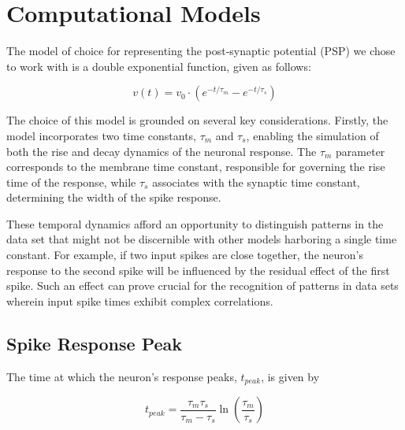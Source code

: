 \section{Computational Models}

The model of choice for representing the post-synaptic potential (PSP) we chose to work with is a double exponential function, given as follows:

\begin{equation}
    v(t) = v_0 \cdot (e^{-t/\tau_m} - e^{-t/\tau_s})
\end{equation}

The choice of this model is grounded on several key considerations. Firstly, the model incorporates two time constants, $\tau_m$ and $\tau_s$, enabling the simulation of both the rise and decay dynamics of the neuronal response. The $\tau_m$ parameter corresponds to the membrane time constant, responsible for governing the rise time of the response, while $\tau_s$ associates with the synaptic time constant, determining the width of the spike response.

These temporal dynamics afford an opportunity to distinguish patterns in the data set that might not be discernible with other models harboring a single time constant. For example, if two input spikes are close together, the neuron's response to the second spike will be influenced by the residual effect of the first spike. Such an effect can prove crucial for the recognition of patterns in data sets wherein input spike times exhibit complex correlations.

\subsection{Spike Response Peak}

\begin{mdframed}[backgroundcolor=red_background, linecolor=black, linewidth=2pt, frametitle=\textbf{Statement}]
\begin{center}

    \label{st:peak}
    The time at which the neuron's response peaks, $t_{peak}$, is given by

    
\begin{equation}
t_{peak} = \frac{\tau_m \tau_s}{\tau_m - \tau_s} \ln\left(\frac{\tau_m}{\tau_s}\right)
\end{equation}

\end{center}
\end{mdframed}

